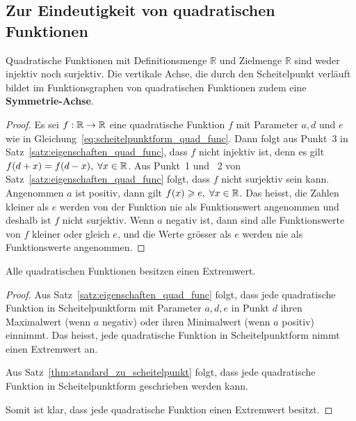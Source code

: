 \documentclass[12pt]{article}
\begin{document}
\subsection{Zur Eindeutigkeit von quadratischen Funktionen}
\begin{lemma}
Quadratische Funktionen mit Definitionsmenge $\mathbb{R}$ und Zielmenge $\mathbb{R}$ sind weder injektiv noch surjektiv. Die vertikale Achse, die durch den Scheitelpunkt verläuft bildet im Funktionsgraphen von quadratischen Funktionen zudem eine \textbf{Symmetrie-Achse}.
\end{lemma}

\begin{proof}
Es sei $f: \mathbb{R} \rightarrow \mathbb{R}$ eine quadratische Funktion $f$ mit Parameter $a, d$ und $e$ wie in Gleichung~\ref{eq:scheitelpunktform_quad_func}. Dann folgt aus Punkt~3 in Satz~\ref{satz:eigenschaften_quad_func}, dass $f$ nicht injektiv ist, denn es gilt $f(d+x)=f(d-x), \; \forall x \in \mathbb{R}$.
Aus Punkt~1 und ~2 von Satz~\ref{satz:eigenschaften_quad_func} folgt, dass $f$ nicht surjektiv sein kann. Angenommen $a$ ist positiv, dann gilt $f(x) \geqslant e, \; \forall x \in \mathbb{R}$. Das heisst, die Zahlen kleiner als $e$ werden von der Funktion nie als Funktionswert angenommen und deshalb ist $f$ nicht surjektiv. Wenn $a$ negativ ist, dann sind alle Funktionswerte von $f$ kleiner oder gleich $e$, und die Werte grösser als $e$ werden nie als Funktionswerte angenommen.
\end{proof}

\begin{lemma}
Alle quadratischen Funktionen besitzen einen Extremwert.
\end{lemma}
\begin{proof}
Aus Satz~\ref{satz:eigenschaften_quad_func} folgt, dass jede quadratische Funktion in Scheitelpunktform mit Parameter $a, d, e$ in Punkt $d$ ihren Maximalwert (wenn $a$ negativ) oder ihren Minimalwert (wenn $a$ positiv) einnimmt. Das heisst, jede quadratische Funktion in Scheitelpunktform nimmt einen Extremwert an.

Aus Satz~\ref{thm:standard_zu_scheitelpunkt} folgt, dass jede quadratische Funktion in Scheitelpunktform geschrieben werden kann.

Somit ist klar, dass jede quadratische Funktion einen Extremwert besitzt.
\end{proof}


\newpage
\end{document}

